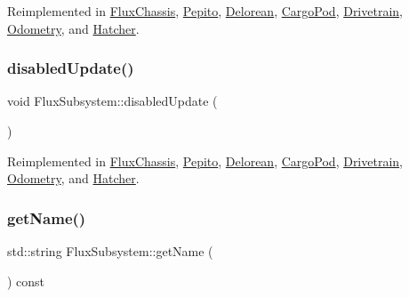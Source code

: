 Reimplemented in \hyperlink{classFluxChassis_a12226856b3b697fe9b5649950083d289}{Flux\+Chassis}, \hyperlink{classPepito_a04a85eae33c653f9555b6db43d50b210}{Pepito}, \hyperlink{classDelorean_ae054ba79b38b46d20e50becb5d31884c}{Delorean}, \hyperlink{classCargoPod_a924ef514ed33ea4e7f7ef966f5b83fa7}{Cargo\+Pod}, \hyperlink{classDrivetrain_ac6fe041de609bdb45eac65282fbdf507}{Drivetrain}, \hyperlink{classOdometry_a0df3b0180a8fa5a01a9e441de112140e}{Odometry}, and \hyperlink{classHatcher_a2e61639f734ec3a5627b655695bbadf1}{Hatcher}.

\mbox{\label{classFluxSubsystem_a5c39cb0f0834cc77a2b8f4f47778da87}} 
\subsubsection{\texorpdfstring{disabled\+Update()}{disabledUpdate()}}
{\footnotesize\ttfamily void Flux\+Subsystem\+::disabled\+Update (\begin{DoxyParamCaption}{ }\end{DoxyParamCaption})\hspace{0.3cm}{\ttfamily [virtual]}}



Reimplemented in \hyperlink{classFluxChassis_a1d3d201e0761cd75a3eb5bab58ea1fb2}{Flux\+Chassis}, \hyperlink{classPepito_afc29a2b7ac94a47381ca213dc2993c39}{Pepito}, \hyperlink{classDelorean_acc8f7d93dd894233d16f34316d363983}{Delorean}, \hyperlink{classCargoPod_a71b58a975ba9f20f4a9023aa3fcbba0e}{Cargo\+Pod}, \hyperlink{classDrivetrain_a46aa479a25757868bfda71081ec7baa2}{Drivetrain}, \hyperlink{classOdometry_aef83c6c62c8e992b20759aec705c2ee8}{Odometry}, and \hyperlink{classHatcher_ab6bb222ab940507490f2009f3113bc41}{Hatcher}.

\mbox{\label{classFluxSubsystem_a661009e388711cd134d519160d1633ac}} 
\subsubsection{\texorpdfstring{get\+Name()}{getName()}}
{\footnotesize\ttfamily std\+::string Flux\+Subsystem\+::get\+Name (\begin{DoxyParamCaption}{ }\end{DoxyParamCaption}) const}

